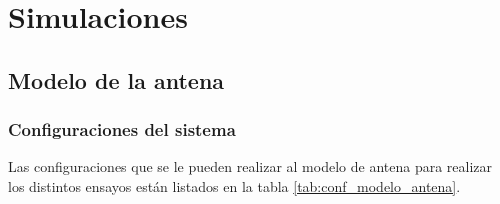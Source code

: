 \chapter{Simulaciones}

\section{Modelo de la antena}

\subsection{Configuraciones del sistema}

Las configuraciones que se le pueden realizar al modelo de antena para realizar los distintos ensayos están listados en la 
tabla \ref{tab:conf_modelo_antena}.

